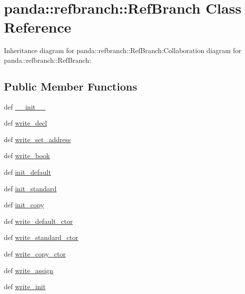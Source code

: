 \hypertarget{classpanda_1_1refbranch_1_1RefBranch}{
\section{panda::refbranch::RefBranch Class Reference}
\label{classpanda_1_1refbranch_1_1RefBranch}
}
Inheritance diagram for panda::refbranch::RefBranch:Collaboration diagram for panda::refbranch::RefBranch:\subsection*{Public Member Functions}
\begin{DoxyCompactItemize}
\item 
def \hyperlink{classpanda_1_1refbranch_1_1RefBranch_a83802ad57265f711eec821988c6d6975}{\_\-\_\-init\_\-\_\-}
\item 
def \hyperlink{classpanda_1_1refbranch_1_1RefBranch_a69bfcd1c3fddf2fc5c77408316fa02db}{write\_\-decl}
\item 
def \hyperlink{classpanda_1_1refbranch_1_1RefBranch_a15316c66747e9d6d033de65ecc904ff3}{write\_\-set\_\-address}
\item 
def \hyperlink{classpanda_1_1refbranch_1_1RefBranch_ab1b81c338c912c13dd94bb6568501ced}{write\_\-book}
\item 
def \hyperlink{classpanda_1_1refbranch_1_1RefBranch_aeae9c75c06bf44c67bf6ae429edc2f14}{init\_\-default}
\item 
def \hyperlink{classpanda_1_1refbranch_1_1RefBranch_a7438765b8f85b85839103a0957f8aa22}{init\_\-standard}
\item 
def \hyperlink{classpanda_1_1refbranch_1_1RefBranch_a0b156c7f55b3ea9ec39f091c2420a88c}{init\_\-copy}
\item 
def \hyperlink{classpanda_1_1refbranch_1_1RefBranch_a529308f5dbe8e68455b3df4d348b761f}{write\_\-default\_\-ctor}
\item 
def \hyperlink{classpanda_1_1refbranch_1_1RefBranch_a6acf684a7e9b2b7733271f07b2d63ce8}{write\_\-standard\_\-ctor}
\item 
def \hyperlink{classpanda_1_1refbranch_1_1RefBranch_a4ad1688aa5e4f87146a3db6bd6999c3b}{write\_\-copy\_\-ctor}
\item 
def \hyperlink{classpanda_1_1refbranch_1_1RefBranch_ac0f58796982b3939022a293a576d3ae2}{write\_\-assign}
\item 
def \hyperlink{classpanda_1_1refbranch_1_1RefBranch_a6d8cb2e71133af0cc0538f7d157a19a1}{write\_\-init}
\end{DoxyCompactItemize}
